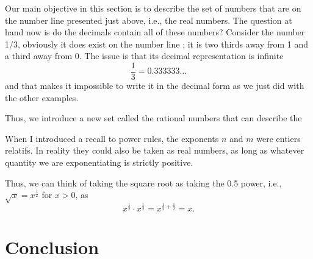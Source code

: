 \documentclass[12pt,a4paper]{article}
\theoremstyle{plain}
\theoremstyle{definition}
\theoremstyle{remark}
\begin{document}
Our main objective in this section is to describe the set of numbers that are on the
number line presented just above, i.e., the real numbers. The question at hand now 
is do the decimals contain all of these numbers? Consider the number 1/3,
obviously it does exist on the number line ; it is two thirds away from 1
and a third away from 0. The issue is that its decimal representation is infinite
\[
\frac{1}{3} = 0.333333 \dots
\]
and that makes it impossible to write it in the decimal form as we just did with 
the other examples.

Thus, we introduce a new set called the rational numbers that can describe the

When I introduced a recall to power rules, the exponents $n$ and $m$ were entiers
relatifs. In reality they could also be taken as real numbers, as long as
whatever quantity we are exponentiating is strictly positive.

Thus, we can think of taking the square root as taking the 0.5 power,
i.e., $\sqrt{x} = x^{\frac{1}{2}}$ for $x > 0$, as
\[
  x^{\frac{1}{2}} \cdot x^{\frac{1}{2}} = x^{\frac{1}{2} + \frac{1}{2}} = x.
\]

\newpage
{}
\section*{Conclusion}
\end{document}
